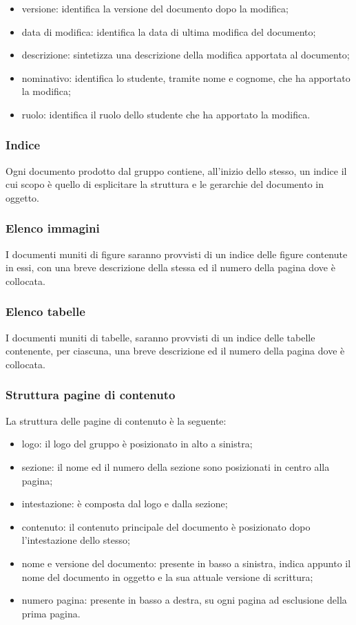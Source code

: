 \begin{itemize}
	\item versione: identifica la versione del documento dopo la modifica;
	\item data di modifica: identifica la data di ultima modifica del documento;
	\item descrizione: sintetizza una descrizione della modifica apportata al documento;
	\item nominativo: identifica lo studente, tramite nome e cognome, che ha apportato la modifica;
	\item ruolo: identifica il ruolo dello studente che ha apportato la modifica.
\end{itemize}

\subsubsection{Indice}
Ogni documento prodotto dal gruppo {\Gruppo} contiene, all’inizio dello stesso, un indice il cui scopo è quello di esplicitare la struttura e le gerarchie del documento in oggetto. 

\subsubsection{Elenco immagini}
I documenti muniti di figure saranno provvisti di un indice delle figure contenute in essi, con una breve descrizione della stessa ed il numero della pagina dove è collocata.


\subsubsection{Elenco tabelle}
I documenti muniti di tabelle, saranno provvisti di un indice delle tabelle contenente, per
ciascuna, una breve descrizione ed il numero della pagina dove è collocata.

\subsubsection{Struttura pagine di contenuto}
La struttura delle pagine di contenuto è la seguente:
\begin{itemize}
	\item logo: il logo del gruppo è posizionato in alto a sinistra;
	\item sezione: il nome ed il numero della sezione sono posizionati in centro alla pagina;
	\item intestazione: è composta dal logo e dalla sezione;
	\item contenuto: il contenuto principale del documento è posizionato dopo l’intestazione dello stesso;
	\item nome e versione del documento: presente in basso a sinistra, indica appunto il nome del documento in oggetto e la sua attuale versione di scrittura;

	\item numero pagina: presente in basso a destra, su ogni pagina ad esclusione della prima pagina.
\end{itemize}



